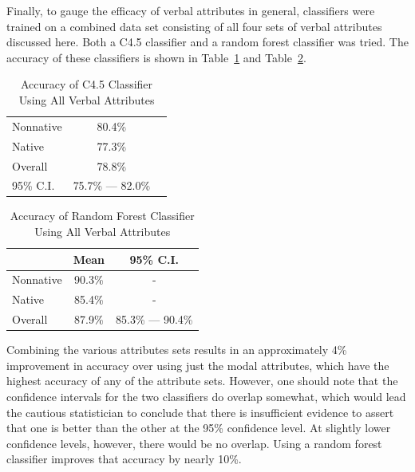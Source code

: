 \documentclass[main.tex]{subfiles}
\begin{document}
Finally, to gauge the efficacy of verbal attributes in general, classifiers were trained on a combined data set consisting of all four sets of verbal attributes discussed here. Both a C4.5 classifier and a random forest classifier was tried. The accuracy of these classifiers is shown in Table~\ref{table:c45-combined-results} and Table~\ref{table:combined-results}.
\begin{table}[htbp]
\centering
\caption{Accuracy of C4.5 Classifier Using All Verbal Attributes}
\begin{tabular}{l c c}
\toprule
Nonnative & 80.4\% \\
Native & 77.3\% \\
Overall & 78.8\% \\ 
95\% C.I. & 75.7\% --- 82.0\%\\
\bottomrule
\end{tabular}
\label{table:c45-combined-results}
\end{table}
\begin{table}[htbp]
\centering
\caption{Accuracy of Random Forest Classifier Using All Verbal Attributes}
\begin{tabular}{l c c}
\toprule
& Mean & 95\% C.I.\\
\midrule
Nonnative & 90.3\% & - \\
Native & 85.4\% & - \\
Overall & 87.9\% & 85.3\% --- 90.4\% \\
\bottomrule
\end{tabular}
\label{table:combined-results}
\end{table}
Combining the various attributes sets results in an approximately 4\% improvement in accuracy over using just the modal attributes, which have the highest accuracy of any of the attribute sets. However, one should note that the confidence intervals for the two classifiers do overlap somewhat, which would lead the cautious statistician to conclude that there is insufficient evidence to assert that one is better than the other at the 95\% confidence level. At slightly lower confidence levels, however, there would be no overlap. Using a random forest classifier improves that accuracy by nearly 10\%.
\biblio
\end{document}

